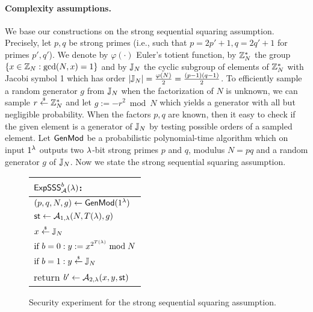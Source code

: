 \paragraph{Complexity assumptions.}
We base our constructions on the strong sequential squaring assumption. Precisely, let $p, q$ be strong primes (i.e., such that $p = 2p'+1,  q= 2q'+1$ for primes $p', q'$). We denote by $\varphi(\cdot)$ Euler's totient function, by $\mathbb{Z}_N^*$ the group $\{x \in \mathbb{Z}_N: \gcd(N,x) = 1\}$ and by $\mathbb{J}_N$ the cyclic subgroup of elements of $\mathbb{Z}_N^*$ with Jacobi symbol 1 which has order $|\mathbb{J}_N| = \frac{\varphi(N)}{2} = \frac{(p-1)(q-1)}{2}$. To efficiently sample a random generator $g$ from $\mathbb{J}_N$ when the factorization of $N$ is unknown, we can sample $r \stackrel{{\scriptscriptstyle\$}}{\leftarrow} \mathbb{Z}_N^*$ and let $g:= -r^2 \bmod N$ which yields a generator with all but negligible probability. When the factors $p,q$ are known, then it easy to check if the given element is a generator of $\mathbb{J}_N$ by testing possible orders of a sampled element. Let $\mathsf{GenMod}$ be a probabilistic polynomial-time algorithm which on input $1{^{\lambda}}$ outputs two $\lambda$-bit strong primes $p$ and $q$, modulus $N= pq$ and a random generator $g$ of $\mathbb{J}_N$. Now we state the strong sequential squaring assumption. 



\begin{figure}[h]
\begin{center}
\begin{tabular}{l}
$\mathsf{ExpSSS}_{\mathcal{A}}^{b}(\lambda)$: \\
\hline
$(p, q, N,g) \leftarrow \mathsf{GenMod}(1{^{\lambda}})$ \\
$\mathsf{st} \leftarrow \mathcal{A}_{1, \lambda}(N, T(\lambda),g)$\\
$x \stackrel{{\scriptscriptstyle\$}}{\leftarrow} \mathbb{J}_N$ \\
$\text{if } b = 0: y:=x^{2^{T(\lambda)}} \bmod N$\\
$\text{if } b = 1: y \stackrel{{\scriptscriptstyle\$}}{\leftarrow} \mathbb{J}_N$\\
return	$b' \leftarrow \mathcal{A}_{2,\lambda}(x, y, \mathsf{st})$
\end{tabular}
\end{center}
\caption{\label{fig:sss}Security experiment for the strong sequential squaring assumption.}
\end{figure}


